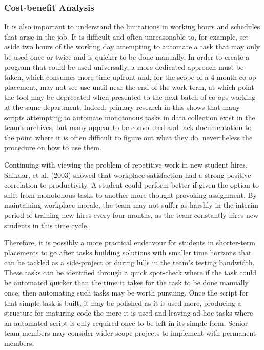 \documentclass[12pt]{article}
\begin{document}
\subsubsection{Cost-benefit Analysis}
\indent\hspace{0.5in} It is also important to understand the limitations in working hours and schedules that arise in the job. It is difficult and often unreasonable to, for example, set aside two hours of the working day attempting to automate a task that may only be used once or twice and is quicker to be done manually. In order to create a program that could be used universally, a more dedicated approach must be taken, which consumes more time upfront and, for the scope of a 4-month co-op placement, may not see use until near the end of the work term, at which point the tool may be deprecated when presented to the next batch of co-ops working at the same department. Indeed, primary research in this shows that many scripts attempting to automate monotonous tasks in data collection exist in the team's archives, but many appear to be convoluted and lack documentation to the point where it is often difficult to figure out what they do, nevertheless the procedure on how to use them. 

\indent\hspace{0.5in} Continuing with viewing the problem of repetitive work in new student hires, Shikdar, et al. (2003) showed that workplace satisfaction had a strong positive correlation to productivity. A student could perform better if given the option to shift from monotonous tasks to another more thought-provoking assignment. By maintaining workplace morale, the team may not suffer as harshly in the interim period of training new hires every four months, as the team constantly hires new students in this time cycle.

\indent\hspace{0.5in} Therefore, it is possibly a more practical endeavour for students in shorter-term placements to go after tasks building solutions with smaller time horizons that can be tackled as a side-project or during lulls in the team's testing bandwidth. These tasks can be identified through a quick spot-check where if the task could be automated quicker than the time it takes for the task to be done manually once, then automating such tasks may be worth pursuing. Once the script for that simple task is built, it may be polished as it is used more, producing a structure for maturing code the more it is used and leaving ad hoc tasks where an automated script is only required once to be left in its simple form. Senior team members may consider wider-scope projects to implement with permanent members.
\end{document}
